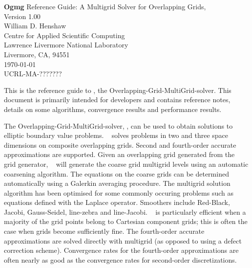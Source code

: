 \documentclass{article}
\begin{document}
\begin{flushleft}
{\Large
{\bf Ogmg} Reference Guide: A Multigrid Solver for Overlapping Grids, \\
Version 1.00 \\
}
\vspace{3\baselineskip}
William D. Henshaw   \\                    
\vspace{2\baselineskip}
Centre for Applied Scientific Computing \\
Lawrence Livermore National Laboratory    \\
Livermore, CA, 94551   \\
\vspace{2\baselineskip}
\today\\
\vspace{\baselineskip}
UCRL-MA-???????


\vspace{4\baselineskip}

This is the reference guide to \Ogmg, the Overlapping-Grid-MultiGrid-solver.
This document is primarily intended for developers and contains reference notes,
details on some algorithms, 
convergence results and performance results. 

The Overlapping-Grid-MultiGrid-solver, \Ogmg, can be used to obtain solutions 
to elliptic boundary value problems.
\Ogmg~ solves problems in two and three space
dimensions on composite overlapping grids. 
Second and fourth-order accurate approximations are supported.
Given an overlapping grid generated from the \Ogen~  grid generator,
\Ogmg~  will generate the coarse grid multigrid levels using an automatic coarsening algorithm.
The equations on the coarse grids can be determined automatically using a Galerkin averaging
procedure.
The multigrid solution algorithm has been optimised for some commonly occuring problems such as
equations defined with the Laplace operator.
Smoothers include Red-Black, Jacobi, Gauss-Seidel, line-zebra and line-Jacobi.
\Ogmg~  is particularly efficient when a majority of the grid points belong to Cartesian component grids;
this is often the case when grids become sufficiently fine.
The fourth-order accurate approximations are solved directly with multigrid (as opposed to using
a defect correction scheme). Convergence rates for the fourth-order approximations are often nearly as
good as the convergence rates for second-order discretizations.
\end{flushleft}
\end{document}

